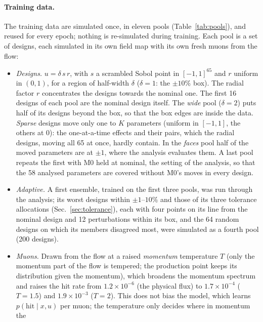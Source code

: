 \documentclass[11pt,a4paper]{article}
\begin{document}
\paragraph{Training data.}
The training data are simulated once, in eleven pools (Table~\ref{tab:pools}), and reused for every
epoch; nothing is re-simulated during training. Each pool is a set of designs, each simulated in
its own field map with its own fresh muons from the flow:
\begin{itemize}
  \item \emph{Designs.} $u=\delta\,s\,r$, with $s$ a scrambled Sobol point in $[-1,1]^{65}$ and
        $r$ uniform in $(0,1)$, for a region of half-width $\delta$ ($\delta=1$: the $\pm10\%$
        box). The radial factor $r$ concentrates the designs towards the nominal one. The first
        16 designs of each pool are the nominal design itself. The \emph{wide} pool ($\delta=2$)
        puts half of its designs beyond the box, so that the box edges are inside the data.
        \emph{Sparse} designs move only one to $K$ parameters (uniform in $[-1,1]$, the others
        at $0$): the one-at-a-time effects and their pairs, which the radial designs, moving all
        65 at once, hardly contain. In the \emph{faces} pool half of the moved parameters are at
        $\pm1$, where the analysis evaluates them. A last pool repeats the first with M0 held at
        nominal, the setting of the analysis, so that the 58 analysed parameters are covered without
        M0's moves in every design.
  \item \emph{Adaptive.} A first ensemble, trained on the first three pools, was run through the
        analysis; its worst designs within $\pm1$--$10\%$ and those of its three tolerance
        allocations (Sec.~\ref{sec:tolerance}), each with four points on its line from the
        nominal design and 12 perturbations within its box, and the 64 random designs on which
        its members disagreed most, were simulated as a fourth pool (200 designs).
  \item \emph{Muons.} Drawn from the flow at a raised \emph{momentum} temperature $T$ (only the
        momentum part of the flow is tempered; the production point keeps its distribution given
        the momentum), which broadens the momentum spectrum and raises the hit rate from
        $1.2\times10^{-6}$ (the physical flux) to $1.7\times10^{-4}$ ($T=1.5$) and
        $1.9\times10^{-3}$ ($T=2$). This does not bias the model, which learns
        $p(\text{hit}\mid x,u)$ per muon; the temperature only decides where in momentum the

\end{itemize}
\end{document}
